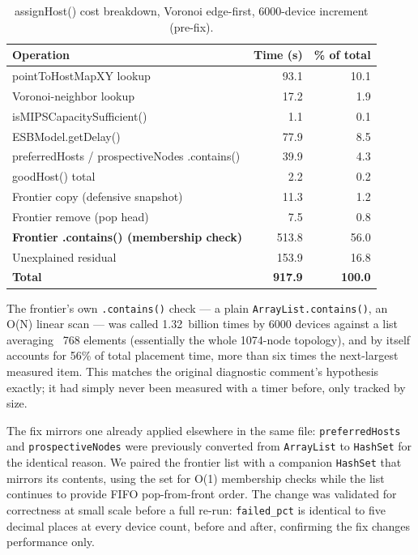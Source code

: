 \documentclass[10pt,conference]{IEEEtran}
\begin{document}
\begin{table}[!t]
\centering
\caption{assignHost() cost breakdown, Voronoi edge-first, 6000-device increment (pre-fix).}
\label{tab:breakdown}
\begin{tabular}{lrr}
\toprule
\textbf{Operation} & \textbf{Time (s)} & \textbf{\% of total} \\
\midrule
pointToHostMapXY lookup & 93.1 & 10.1 \\
Voronoi-neighbor lookup & 17.2 & 1.9 \\
isMIPSCapacitySufficient() & 1.1 & 0.1 \\
ESBModel.getDelay() & 77.9 & 8.5 \\
preferredHosts / prospectiveNodes .contains() & 39.9 & 4.3 \\
goodHost() total & 2.2 & 0.2 \\
Frontier copy (defensive snapshot) & 11.3 & 1.2 \\
Frontier remove (pop head) & 7.5 & 0.8 \\
\textbf{Frontier .contains() (membership check)} & 513.8 & 56.0 \\
Unexplained residual & 153.9 & 16.8 \\
\midrule
\textbf{Total} & \textbf{917.9} & \textbf{100.0} \\
\bottomrule
\end{tabular}
\end{table}

The frontier's own \texttt{.contains()} check --- a plain \texttt{ArrayList.contains()}, an O(N) linear scan --- was called 1.32~billion times by 6000 devices against a list averaging ~768 elements (essentially the whole 1074-node topology), and by itself accounts for 56\% of total placement time, more than six times the next-largest measured item. This matches the original diagnostic comment's hypothesis exactly; it had simply never been measured with a timer before, only tracked by size.

The fix mirrors one already applied elsewhere in the same file: \texttt{preferredHosts} and \texttt{prospectiveNodes} were previously converted from \texttt{ArrayList} to \texttt{HashSet} for the identical reason. We paired the frontier list with a companion \texttt{HashSet} that mirrors its contents, using the set for O(1) membership checks while the list continues to provide FIFO pop-from-front order. The change was validated for correctness at small scale before a full re-run: \texttt{failed\_pct} is identical to five decimal places at every device count, before and after, confirming the fix changes performance only.
\end{document}
